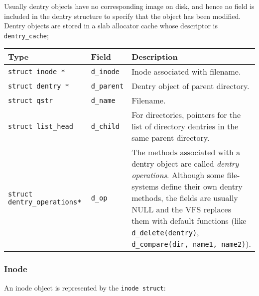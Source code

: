 \documentclass[10pt,a4paper]{article}
\begin{document}
Usually dentry objects have no corresponding image on disk, and hence no field is included in the dentry structure to specify that the object has been modified. Dentry objects are stored in a slab allocator cache whose descriptor is \texttt{dentry\_cache}; 

\begin{center}
\begin{tabular}{l|l|p{13cm}} 

\toprule
Type & Field & Description \\
\midrule

\texttt{struct inode *} & \texttt{d\_inode} & Inode associated with filename. 

\\


\texttt{struct dentry *} & \texttt{d\_parent} & Dentry object of parent directory. 

\\
\texttt{struct qstr} & \texttt{d\_name} & Filename. 

\\
\texttt{struct list\_head} & \texttt{d\_child} & For directories, pointers for the list of directory dentries in the same parent directory.

\\
\texttt{struct dentry\_operations*} & \texttt{d\_op} & The methods associated with a dentry object are called \textit{dentry operations}. Although some file-systems define their own dentry methods, the fields are usually NULL and the VFS replaces them with default functions (like \texttt{d\_delete(dentry)}, \texttt{d\_compare(dir, name1, name2)}). 

\\

\bottomrule
\end{tabular}
\end{center}


\subsubsection{Inode}

An inode object is represented by the \texttt{inode struct}:
\end{document}
